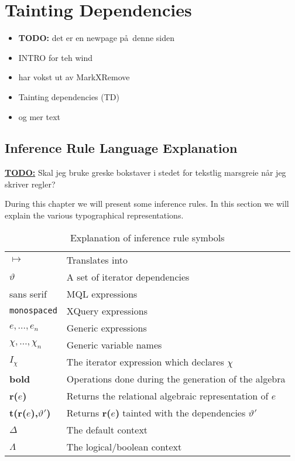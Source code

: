 \newpage
\section{Tainting Dependencies}
\label{sect:trans:taintingDependencies}

\begin{itemize}
  \item \textbf{\LARGE TODO:} det er en newpage p\aa~denne siden
  \item INTRO for teh wind
  \item har vokst ut av MarkXRemove
  \item Tainting dependencies (TD)
  \item og mer text
\end{itemize}

\subsection{Inference Rule Language Explanation}
\label{sect:trans:TD:langExpl}
\underline{\textbf{\LARGE TODO:}} Skal jeg bruke greske bokstaver i stedet for tekstlig marsgreie n\aa r jeg
skriver regler?

During this chapter we will present some inference rules. In this section we will explain the various
typographical representations.

\begin{table}[h]
\centering
\begin{tabular}{l|l}

  $\longmapsto$  			& Translates into \\
  $\vartheta$ 				& A set of iterator dependencies \\
  \textsf{sans serif} 		& MQL expressions \\
  \texttt{monospaced} 		& XQuery expressions \\
  $e,\ldots,e_{n}$			& Generic expressions \\
  $\chi,\ldots,\chi_{n}$	& Generic variable names \\
  $I_{\chi}$				& The iterator expression which declares $\chi$ \\
  \textbf{bold} 			& Operations done during the generation of the algebra \\
  \textbf{r(}$e$\textbf{)} 	& Returns the relational algebraic representation of $e$   \\
  \textbf{t(}\textbf{r(}$e$\textbf{)}\textbf{,}$\vartheta'$\textbf{)} & Returns \textbf{r(}$e$\textbf{)} tainted
  with the dependencies $\vartheta'$ \\
  $\Delta$ 					&  The default context \\ 
  $\Lambda$ 				& The logical/boolean context \\
  
\end{tabular}
\caption{Explanation of inference rule symbols}
\label{tab:trans:td:langExpl}
\end{table}

